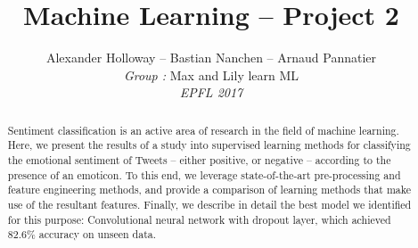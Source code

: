 \documentclass[10pt,conference,compsocconf]{IEEEtran}
\begin{document}
\title{Machine Learning -- Project 2}
\author{
 Alexander Holloway -- Bastian Nanchen -- Arnaud Pannatier 
  \\
  \textit{Group : }Max and Lily learn ML \\
  \textit{EPFL 2017}
}
\maketitle

\begin{abstract}
Sentiment classification is an active area of research in the field of machine learning. Here, we present the results of a study into supervised learning methods for classifying the emotional sentiment of Tweets -- either positive, or negative -- according to the presence of an emoticon. To this end, we leverage state-of-the-art pre-processing and feature engineering methods, and provide a comparison of learning methods that make use of the resultant features. Finally, we describe in detail the best model we identified for this purpose: Convolutional neural network with dropout layer, which achieved 82.6\% accuracy on unseen data.
\end{abstract}









\end{document}
